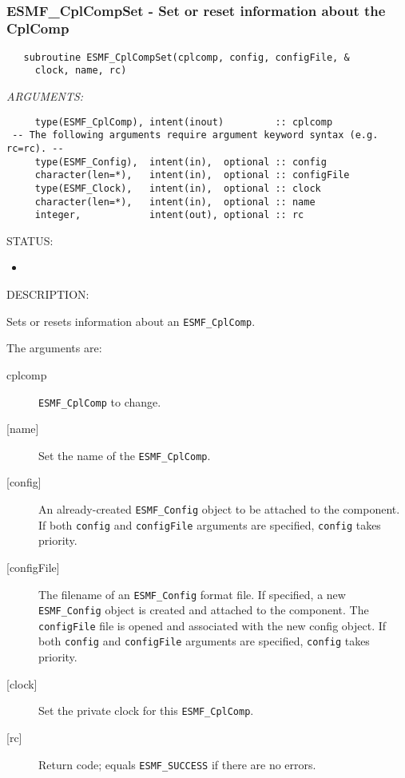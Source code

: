  
\mbox{}\hrulefill\ 
 
\subsubsection [ESMF\_CplCompSet] {ESMF\_CplCompSet - Set or reset information about the CplComp}


  
\begin{verbatim}   subroutine ESMF_CplCompSet(cplcomp, config, configFile, &
     clock, name, rc)\end{verbatim}{\em ARGUMENTS:}
\begin{verbatim}     type(ESMF_CplComp), intent(inout)         :: cplcomp
 -- The following arguments require argument keyword syntax (e.g. rc=rc). --
     type(ESMF_Config),  intent(in),  optional :: config
     character(len=*),   intent(in),  optional :: configFile
     type(ESMF_Clock),   intent(in),  optional :: clock
     character(len=*),   intent(in),  optional :: name
     integer,            intent(out), optional :: rc\end{verbatim}
{\sf STATUS:}
   \begin{itemize}
   \item{}
   \end{itemize}
  
{\sf DESCRIPTION:\\ }


   Sets or resets information about an {\tt ESMF\_CplComp}.
  
   The arguments are:
   \begin{description}
   \item[cplcomp]
     {\tt ESMF\_CplComp} to change.
   \item[{[name]}]
     Set the name of the {\tt ESMF\_CplComp}.
   \item[{[config]}]
     An already-created {\tt ESMF\_Config} object to be attached to the
     component.
     If both {\tt config} and {\tt configFile} arguments are specified,
     {\tt config} takes priority.
   \item[{[configFile]}]
     The filename of an {\tt ESMF\_Config} format file.
     If specified, a new {\tt ESMF\_Config} object is created and attached to the
     component. The {\tt configFile} file is opened and associated
     with the new config object.
     If both {\tt config} and {\tt configFile} arguments are specified,
     {\tt config} takes priority.
   \item[{[clock]}]
     Set the private clock for this {\tt ESMF\_CplComp}.
   \item[{[rc]}]
     Return code; equals {\tt ESMF\_SUCCESS} if there are no errors.
   \end{description}
   
